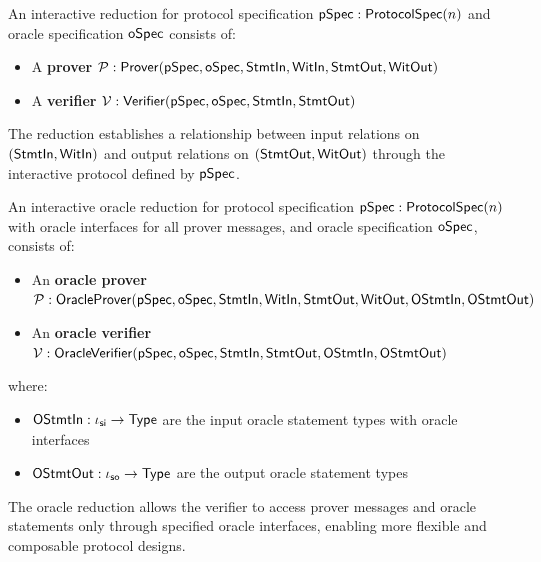 \begin{definition}
    \label{def:reduction}
    An interactive reduction for protocol specification \(\mathsf{pSpec} : \mathsf{ProtocolSpec}(n)\) and oracle specification \(\mathsf{oSpec}\) consists of:
    \begin{itemize}
        \item A \textbf{prover} \(\mathcal{P} : \mathsf{Prover}(\mathsf{pSpec}, \mathsf{oSpec}, \mathsf{StmtIn}, \mathsf{WitIn}, \mathsf{StmtOut}, \mathsf{WitOut})\)
        \item A \textbf{verifier} \(\mathcal{V} : \mathsf{Verifier}(\mathsf{pSpec}, \mathsf{oSpec}, \mathsf{StmtIn}, \mathsf{StmtOut})\)
    \end{itemize}

    The reduction establishes a relationship between input relations on \((\mathsf{StmtIn}, \mathsf{WitIn})\) and output relations on \((\mathsf{StmtOut}, \mathsf{WitOut})\) through the interactive protocol defined by \(\mathsf{pSpec}\).
    \leanok
\end{definition}

\begin{definition}
    \label{def:oracle_reduction}
    An interactive oracle reduction for protocol specification \(\mathsf{pSpec} : \mathsf{ProtocolSpec}(n)\) with oracle interfaces for all prover messages, and oracle specification \(\mathsf{oSpec}\), consists of:
    \begin{itemize}
        \item An \textbf{oracle prover} \(\mathcal{P} : \mathsf{OracleProver}(\mathsf{pSpec}, \mathsf{oSpec}, \mathsf{StmtIn}, \mathsf{WitIn}, \mathsf{StmtOut}, \mathsf{WitOut}, \mathsf{OStmtIn}, \mathsf{OStmtOut})\)
        \item An \textbf{oracle verifier} \(\mathcal{V} : \mathsf{OracleVerifier}(\mathsf{pSpec}, \mathsf{oSpec}, \mathsf{StmtIn}, \mathsf{StmtOut}, \mathsf{OStmtIn}, \mathsf{OStmtOut})\)
    \end{itemize}

    where:
    \begin{itemize}
        \item \(\mathsf{OStmtIn} : \iota_{\mathsf{si}} \to \mathsf{Type}\) are the input oracle statement types with oracle interfaces
        \item \(\mathsf{OStmtOut} : \iota_{\mathsf{so}} \to \mathsf{Type}\) are the output oracle statement types
    \end{itemize}

    The oracle reduction allows the verifier to access prover messages and oracle statements only through specified oracle interfaces, enabling more flexible and composable protocol designs.
    \leanok
\end{definition}

